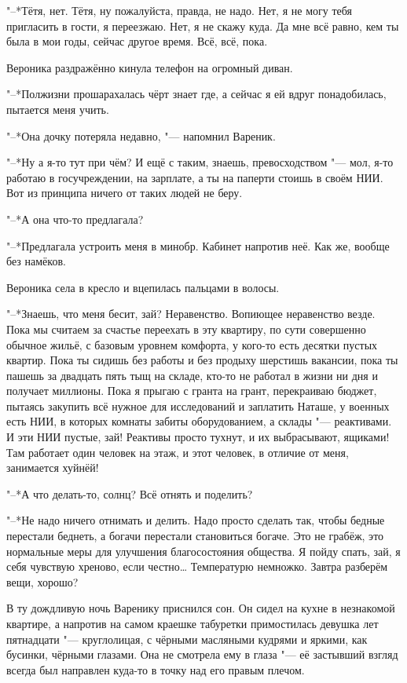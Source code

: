 "--*Тётя, нет.
Тётя, ну пожалуйста, правда, не надо.
Нет, я не могу тебя пригласить в гости, я переезжаю.
Нет, я не скажу куда.
Да мне всё равно, кем ты была в мои годы, сейчас другое время.
Всё, всё, пока.

Вероника раздражённо кинула телефон на огромный диван.

"--*Полжизни прошарахалась чёрт знает где, а сейчас я ей вдруг понадобилась, пытается меня учить.

"--*Она дочку потеряла недавно, "--- напомнил Вареник.

"--*Ну а я-то тут при чём?
И ещё с таким, знаешь, превосходством "--- мол, я-то работаю в госучреждении, на зарплате, а ты на паперти стоишь в своём НИИ.
Вот из принципа ничего от таких людей не беру.

"--*А она что-то предлагала?

"--*Предлагала устроить меня в минобр.
Кабинет напротив неё.
Как же, вообще без намёков.

Вероника села в кресло и вцепилась пальцами в волосы.

"--*Знаешь, что меня бесит, зай?
Неравенство.
Вопиющее неравенство везде.
Пока мы считаем за счастье переехать в эту квартиру, по сути совершенно обычное жильё, с базовым уровнем комфорта, у кого-то есть десятки пустых квартир.
Пока ты сидишь без работы и без продыху шерстишь вакансии, пока ты пашешь за двадцать пять тыщ на складе, кто-то не работал в жизни ни дня и получает миллионы.
Пока я прыгаю с гранта на грант, перекраиваю бюджет, пытаясь закупить всё нужное для исследований и заплатить Наташе, у военных есть НИИ, в которых комнаты забиты оборудованием, а склады "--- реактивами.
И эти НИИ пустые, зай!
Реактивы просто тухнут, и их выбрасывают, ящиками!
Там работает один человек на этаж, и этот человек, в отличие от меня, занимается хуйнёй!

"--*А что делать-то, солнц?
Всё отнять и поделить?

"--*Не надо ничего отнимать и делить.
Надо просто сделать так, чтобы бедные перестали беднеть, а богачи перестали становиться богаче.
Это не грабёж, это нормальные меры для улучшения благосостояния общества.
Я пойду спать, зай, я себя чувствую хреново, если честно\ldots{}
Температурю немножко.
Завтра разберём вещи, хорошо?

\asterism

\label{Sat_2012_06_09}

В ту дождливую ночь Варенику приснился сон.
Он сидел на кухне в незнакомой квартире, а напротив на самом краешке табуретки примостилась девушка лет пятнадцати "--- круглолицая, с чёрными масляными кудрями и яркими, как бусинки, чёрными глазами.
Она не смотрела ему в глаза "--- её застывший взгляд всегда был направлен куда-то в точку над его правым плечом.

